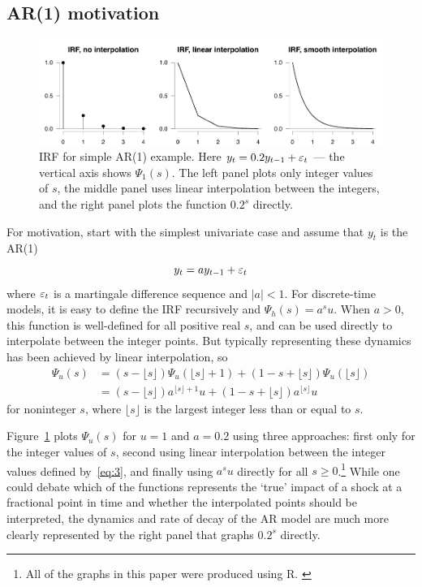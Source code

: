 \documentclass[12pt,fleqn]{article}
\begin{document}
\subsection{AR(1) motivation}
\label{S2.1}

\begin{figure}[t]
  \centering
  \includegraphics[width=6.5in]{graphs/motivation.pdf}
  \caption{IRF for simple AR(1) example. Here $y_t = 0.2 y_{t-1} +
    \varepsilon_t$ --- the vertical axis shows $\Psi_1(s)$. The left panel
    plots only integer values of $s$, the middle panel uses linear
    interpolation between the integers, and the right panel plots the
    function $0.2^s$ directly.}
  \label{fig:1}
\end{figure}

For motivation, start with the simplest univariate case and assume
that $y_t$ is the AR(1)
\begin{equation}
  \label{eq:1}
  y_t = a y_{t-1} + \varepsilon_t
\end{equation}
where $\varepsilon_t$ is a martingale difference sequence and
$\lvert a \rvert < 1$.  For discrete-time models, it is easy to define
the IRF recursively and $\Psi_h(s) = a^s u$. When $a > 0$, this
function is well-defined for all positive real $s$, and can be used
directly to interpolate between the integer points. But typically
representing these dynamics has been achieved by linear interpolation,
so
\begin{align}
  \label{eq:2}
  \Psi_u(s)
  &= (s - \lfloor s\rfloor) \Psi_u(\lfloor s\rfloor+1)
    + (1 - s + \lfloor s\rfloor) \Psi_u(\lfloor s\rfloor) \\
  \label{eq:3}
  &= (s - \lfloor s\rfloor) a^{\lfloor s \rfloor + 1} u
    + (1 - s + \lfloor s\rfloor) a^{\lfloor s \rfloor} u
\end{align}
for noninteger $s$, where $\lfloor s\rfloor$ is the largest integer
less than or equal to $s$.

Figure~\ref{fig:1} plots $\Psi_u(s)$ for $u = 1$ and $a = 0.2$ using
three approaches: first only for the integer values of $s$, second
using linear interpolation between the integer values defined
by~\eqref{eq:3}, and finally using $a^s u$ directly for all
$s \geq 0$.\footnote{%
  All of the graphs in this paper were produced using R. \citep{R}} %
While one could debate which of the functions represents the `true'
impact of a shock at a fractional point in time and whether the
interpolated points should be interpreted, the dynamics and rate of
decay of the AR model are much more clearly represented by the right
panel that graphs $0.2^s$ directly.
\end{document}
